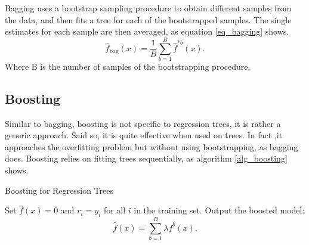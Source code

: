 \documentclass[a4paper,11pt]{article}
\begin{document}
Bagging uses a bootstrap sampling procedure to obtain different samples from the data, and then fits a tree for each of the bootstrapped samples. The single estimates for each sample are then averaged, as equation \ref{eq_bagging} shows. 
\begin{equation}
  \label{eq_bagging}
  \hat{f}_{\text{bag}}(x) = \frac{1}{B} \sum_{b=1}^{B} \hat{f}^{*b}(x).
\end{equation}
Where B is the number of samples of the bootstrapping procedure.

\subsection{Boosting}

Similar to bagging, boosting is not specific to regression trees, it is rather a generic approach. Said so, it is quite effective when used on trees. In fact ,it approaches the overfitting problem but without using bootstrapping, as bagging does. Boosting relies on fitting trees sequentially, as algorithm \ref{alg_boosting} shows. 


\begin{algorithm}
  \caption{Boosting for Regression Trees}
  \label{alg_boosting}
  \SetAlgoLined
  \DontPrintSemicolon
  
  Set $\hat{f}(x) = 0$ and $r_i = y_i$ for all $i$ in the training set.\;
  Output the boosted model:
  \begin{equation}
  \hat{f}(x) = \sum_{b=1}^B \lambda f^b(x).
  \end{equation}\;
  
\end{algorithm}
  


\newpage

\printbibliography
\end{document}
